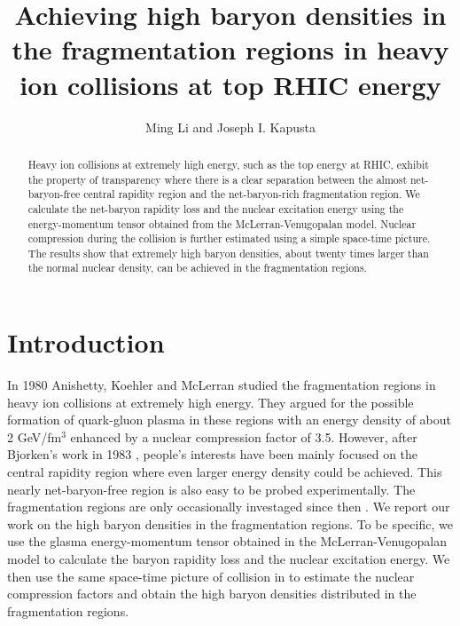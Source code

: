 \documentclass[a4paper]{jpconf}
\begin{document}
\title{Achieving high baryon densities in the fragmentation regions in heavy ion collisions at top RHIC energy}

\author{Ming Li and Joseph I. Kapusta}

\address{School of Physics and Astronomy, University of Minneosota, Minneapolis, MN 55455, USA}


\begin{abstract}
 Heavy ion collisions at extremely high energy, such as the top
energy at RHIC, exhibit the property of
transparency where there is a clear separation between the almost
net-baryon-free central rapidity region and the net-baryon-rich
fragmentation region. We calculate the net-baryon rapidity loss and
the nuclear excitation energy using the energy-momentum tensor obtained
from the McLerran-Venugopalan model. Nuclear compression during the
collision is further estimated using a simple space-time picture. The
results show that extremely high baryon densities, about twenty times
larger than the normal nuclear density, can be achieved in the
fragmentation regions. 
\end{abstract}


\section{Introduction}
In 1980 Anishetty, Koehler and McLerran \cite{Anishetty1980} studied the fragmentation regions in heavy ion collisions at extremely high energy. They argued for the possible formation of quark-gluon plasma in these regions with an energy density of about 2 GeV/fm$^3$ enhanced by a nuclear compression factor of 3.5.  
However, after Bjorken's work in 1983 \cite{Bjorken1983}, people's interests have been mainly focused on the central rapidity region where even larger energy density could be achieved. This nearly net-baryon-free region is also easy to be probed experimentally. The fragmentation regions are only occasionally investaged since then \cite{Csernai1984,Gyulassy1986, Mishustin2002, Frankfurt2003, Mishustin2007}. We report our work on the high baryon densities in the fragmentation regions. To be specific, we use the glasma energy-momentum tensor obtained in the McLerran-Venugopalan model \cite{McLerran1994} to calculate the baryon rapidity loss and the nuclear excitation energy. We then use the same space-time picture of collision in \cite{Anishetty1980} to estimate the nuclear compression factors and obtain the high baryon densities distributed in the fragmentation regions.
 
\end{document}

